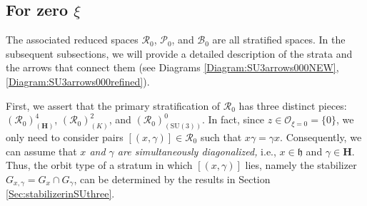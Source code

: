 \documentclass[12pt]{amsart}
\theoremstyle{definition}
\numberwithin{equation}{section}
\newcommand{\SU}{\mathrm{SU}}
\newcommand{\SET}[1]{\{#1\}}
\newcommand{\Cartan}{\mathbf{H}}
\newcommand{\cartan}{\mathfrak{h}}
\newcommand{\Rxizero}{\mathcal{R}_{0}}
\newcommand{\Pxizero}{\mathcal{P}_{0}}
\newcommand{\Bxizero}{\mathcal{B}_{0}}
\begin{document}
\subsection{For zero $\xi$}\label{subSec:xi=0}


The associated reduced spaces $\Rxizero $, $\Pxizero $, and $\Bxizero $ are all stratified spaces.  In the subsequent subsections, we will provide a detailed description of the strata and the arrows that connect them (see Diagrams \eqref{Diagram:SU3arrows000NEW}, \eqref{Diagram:SU3arrows000refined}).








First, we assert that the primary stratification of $\Rxizero $ has three distinct pieces: $(\Rxizero)^4_{(\Cartan)}$, $(\Rxizero)^2_{(K)}$, and $(\Rxizero)^0_{(\SU(3))}$.  
In fact, since   $z\in \mathcal{O}_{\xi=0} = \SET{0}$,      we only  need to consider pairs $[(x, \gamma)]\in \Rxizero $ such that $x\gamma = \gamma x$. Consequently, we can assume that \emph{$x$ and $\gamma$ are simultaneously diagonalized, } i.e., $x\in \cartan$ and $\gamma\in \Cartan$. Thus, the orbit type of a stratum in which  $[(x, \gamma)]$ lies, namely the stabilizer $G_{ x,\gamma }=G_x\cap G_{\gamma}$, can be determined by the results in Section \ref{Sec:stabilizerinSUthree}. 
 
\end{document}
